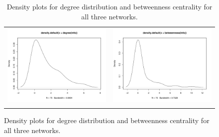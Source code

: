 \documentclass[fleqn,12pt]{wlscirep}
\begin{document}
\begin{figure}
\begin{longtable}[!h]{cc}
\includegraphics[height=.2\textheight, clip=true, trim=1cm 1cm 0cm 2cm]{figures/deg_info.pdf} &
\includegraphics[height=.2\textheight, clip=true, trim=1cm 1cm 0cm 2cm]{figures/cen_info.pdf} \\
\caption{\label{fig:SS_plots} Density plots for degree distribution and betweenness centrality for all three networks.}
\end{longtable}
\end{figure}
\end{document}
